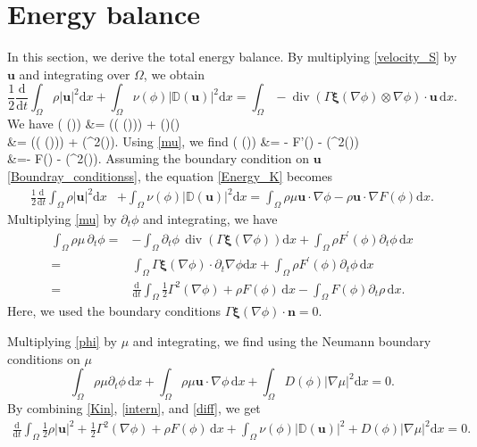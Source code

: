 \documentclass[11pt]{article}
\def\bq{\begin{equation}}
\def\eq{\end{equation}}
\def\bal#1\eal{\begin{align}#1\end{align}}
\def\bfu{\mathbf{u}}
\def\bfn{\mathbf{n}}
\def\bfxi{\boldsymbol{\xi}}
\def\md{\mathrm{d}}
\def\bq{\begin{equation}}
\def\eq{\end{equation}}
\def\bal#1\eal{\begin{align}#1\end{align}}
\def\Ga{\Gamma}
\def\na{\nabla}
\def\na{\nabla}
\def\nn{\nonumber}
\begin{document}
\section{Energy balance}\label{Energy balance}
In this section, we derive the total energy balance. By multiplying \eqref{velocity_S} by $\bfu$ and integrating over $\Omega$, we obtain
\bq
\frac{1}{2}\frac{ \md}{ \md t}\int_{\Omega} \rho |\bfu|^2 \md x + \int_{\Omega}\nu(\phi)|\mathbb{D}(\bfu)|^2 \md x = \int_{\Omega} - \operatorname{div}({ \Ga\bfxi(\na \phi)}\otimes\nabla\phi)\cdot\bfu\,\md x.\label{Energy_K}
\eq
We have
\bal
\operatorname{div} ({ \Ga\bfxi(\nabla\phi)}\otimes\nabla\phi) &= \nabla\phi(({ \Ga\bfxi(\nabla\phi)})) + { { \Ga\bfxi(\nabla\phi)}\cdot\nabla(\nabla\phi)} \nn\\
&= \nabla\phi(({ \Ga\bfxi(\nabla\phi)})) + \nabla\left(\Gamma^2(\nabla\phi)\right).
\eal
Using \eqref{mu}, we find
\bal
- ({ \Ga\bfxi(\nabla\phi)}\otimes\nabla\phi) &=
\rho \mu \nabla\phi - \rho F'(\phi) \nabla \phi - \nabla\left(\Gamma^2(\nabla\phi)\right)\nn\\
&=\rho \mu \nabla\phi - \rho \nabla F(\phi) - \nabla\left(\Gamma^2(\nabla\phi)\right).
\eal
Assuming the boundary condition on $\bfu$ \eqref{Boundray_conditionss}, the equation \eqref{Energy_K} becomes 
\bq
\begin{aligned}
\frac{1}{2}\frac{ \md}{ \md t}\int_{\Omega} \rho |\bfu|^2 \md x &+ \int_{\Omega}\nu(\phi)|\mathbb{D}(\bfu)|^2 \md x =\int_{\Omega} \rho \mu \bfu\cdot\nabla\phi- \rho \bfu\cdot\nabla F(\phi)\md x.\label{Kin}
\end{aligned}
\eq
Multiplying \eqref{mu} by $\partial_t \phi$ and integrating, we have
\bq
\begin{aligned}
\int_{\Omega} \rho\mu \, \partial_t\phi =& - \int_{\Omega} \partial_t \phi \, \operatorname{div}({ \Ga\bfxi(\nabla\phi)})\md x+ \int_{\Omega}\rho F^{\prime}(\phi)\partial_t\phi\, \md x \\
=& \int_{\Omega} { \Ga\bfxi(\nabla\phi)} \cdot \partial_t\nabla\phi \md x + \int_{\Omega} \rho F^{\prime}(\phi) \partial_t \phi\, \md x\\
=&\frac{\md}{\md t}\int_{\Omega} \frac{1}{2}\Gamma^2(\nabla\phi) + \rho F(\phi) \, \md x -\int_{\Omega} F(\phi)\partial_t\rho\, \md x.
\label{intern}
\end{aligned}
\eq
Here, we used the boundary conditions $\Ga\bfxi(\nabla\phi)\cdot\bfn = 0$.

Multiplying \eqref{phi} by $\mu$ and integrating, we find using the Neumann boundary conditions on $\mu$
\bq
\int_{\Omega} \rho \mu \partial_t \phi \, \md x + \int_{\Omega} \rho \mu \bfu \cdot \nabla \phi\, \md x + \int_{\Omega} D(\phi)|\nabla\mu|^2 \md x = 0. \label{diff} 
\eq
By combining \eqref{Kin}, \eqref{intern}, and \eqref{diff}, we get
\bq
\begin{aligned}
\frac{ \md}{ \md t}\int_{\Omega} \frac{1}{2}\rho |\bfu|^2 + \frac{1}{2}\Gamma^2(\nabla\phi) + \rho F(\phi)\,\md x + \int_{\Omega}\nu(\phi)|\mathbb{D}(\bfu)|^2 + D(\phi)|\nabla \mu|^2 \md x= 0.
\end{aligned}
\eq
\end{document}
